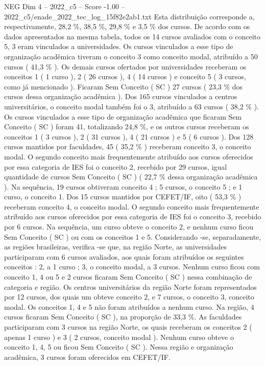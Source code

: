 \begin{textsample}{NEG Dim 4 – 2022\_c5 – Score -1.00 – 2022\_c5/enade\_2022\_tec\_log\_15f82e2ab1.txt}
Esta distribuição corresponde a, respectivamente, 28,2 \%, 38,5 \%, 29,8 \% e 3,5 \% dos cursos.
De acordo com os dados apresentados na mesma tabela, todos os 14 cursos avaliados com o conceito 5, 3 eram vinculados a universidades.
Os cursos vinculados a esse tipo de organização acadêmica tiveram o conceito 3 como conceito modal, atribuído a 50 cursos ( 41,3 \% ).
Os demais cursos ofertados por universidades receberam os conceitos 1 ( 1 curso ), 2 ( 26 cursos ), 4 ( 14 cursos ) e conceito 5 ( 3 cursos, como já mencionado ).
Ficaram Sem Conceito ( SC ) 27 cursos ( 23,3 \% dos cursos dessa organização acadêmica ).
Dos 165 cursos vinculados a centros universitários, o conceito modal também foi o 3, atribuído a 63 cursos ( 38,2 \% ).
Os cursos vinculados a esse tipo de organização acadêmica que ficaram Sem Conceito ( SC ) foram 41, totalizando 24,8 \%, e os outros cursos receberam os conceitos 1 ( 3 cursos ), 2 ( 31 cursos ), 4 ( 21 cursos ) e 5 ( 6 cursos ).
Dos 128 cursos mantidos por faculdades, 45 ( 35,2 \% ) receberam conceito 3, o conceito modal.
O segundo conceito mais frequentemente atribuído aos cursos oferecidos por essa categoria de IES foi o conceito 2, recebido por 29 cursos, igual quantidade de cursos Sem Conceito ( SC ) ( 22,7 \% dessa organização acadêmica ).
Na sequência, 19 cursos obtiveram conceito 4 ; 5 cursos, o conceito 5 ; e 1 curso, o conceito 1.
Dos 15 cursos mantidos por CEFET/IF, oito ( 53,3 \% ) receberam conceito 4, o conceito modal.
O segundo conceito mais frequentemente atribuído aos cursos oferecidos por essa categoria de IES foi o conceito 3, recebido por 6 cursos.
Na sequência, um curso obteve o conceito 2, e nenhum curso ficou Sem Conceito ( SC ) ou com os conceitos 1 e 5.
Considerando -se, separadamente, as regiões brasileiras, verifica -se que, na região Norte, as universidades participaram com 6 cursos avaliados, aos quais foram atribuídos os seguintes conceitos : 2, a 1 curso ; 3, o conceito modal, a 3 cursos.
Nenhum curso ficou com conceito 1, 4 ou 5 e 2 cursos ficaram Sem Conceito ( SC ) nessa combinação de categoria e região.
Os centros universitários da região Norte foram representados por 12 cursos, dos quais um obteve conceito 2, e 7 cursos, o conceito 3, conceito modal.
Os conceitos 1, 4 e 5 não foram atribuídos a nenhum curso.
Na região, 4 cursos ficaram Sem Conceito ( SC ), na proporção de 33,3 \%.
As faculdades participaram com 3 cursos na região Norte, os quais receberam os conceitos 2 ( apenas 1 curso ) e 3 ( 2 cursos, conceito modal ).
Nenhum curso obteve o conceito 1, 4, 5 ou ficou Sem Conceito ( SC ).
Nessa região e organização acadêmica, 3 cursos foram oferecidos em CEFET/IF.

\end{textsample}
